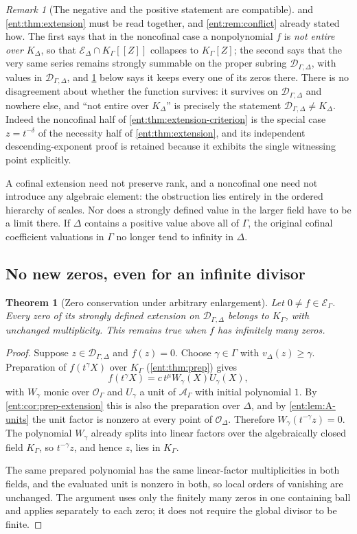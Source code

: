 \documentclass[11pt]{article}
\newtheorem{theorem}{Theorem}[section]
\theoremstyle{plain}
\theoremstyle{plain}
\theoremstyle{plain}
\theoremstyle{definition}
\theoremstyle{definition}
\theoremstyle{definition}
\theoremstyle{definition}
\theoremstyle{remark}
\newtheorem{remark}[remark]{Remark}
\newcommand{\K}{K_\Gamma}\newcommand{\KD}{K_\Delta}
\newcommand{\E}{\mathcal E_\Gamma}
\newcommand{\A}{\mathcal A_\Gamma}\newcommand{\OO}{\mathcal O_\Gamma}
\newcommand{\Dom}{\mathcal D_{\Gamma,\Delta}}
\begin{document}
\begin{remark}[The negative and the positive statement are compatible]
\label{ent:rem:reconcile}
 and \cref{ent:thm:extension} must be read
together, and \cref{ent:rem:conflict} already stated how. The first says that
in the noncofinal case a nonpolynomial $f$ is \emph{not entire over} $\KD$,
so that $\mathcal E_\Delta\cap\K[[Z]]$ collapses to $\K[Z]$; the second says
that the very same series remains strongly summable on the proper subring
$\Dom$, with values in $\Dom$, and \cref{ent:thm:zero-conservation} below
says it keeps every one of its zeros there. There is no disagreement about
whether the function survives: it survives on $\Dom$ and nowhere else, and
``not entire over $\KD$'' is precisely the statement $\Dom\ne\KD$. Indeed the
noncofinal half of \cref{ent:thm:extension-criterion} is the special case
$z=t^{-\delta}$ of the necessity half of \cref{ent:thm:extension}, and its
independent descending-exponent proof is retained because it exhibits the
single witnessing point explicitly.
\end{remark}

A cofinal extension need not preserve rank, and a noncofinal one need not
introduce any algebraic element: the obstruction lies entirely in the ordered
hierarchy of scales. Nor does a strongly defined value in the larger field
have to be a limit there. If $\Delta$ contains a positive value above all of
$\Gamma$, the original cofinal coefficient valuations in $\Gamma$ no longer
tend to infinity in $\Delta$.

\subsection{No new zeros, even for an infinite divisor}
\begin{theorem}[Zero conservation under arbitrary enlargement]
\label{ent:thm:zero-conservation}
Let $0\ne f\in\E$. Every zero of its strongly defined extension on $\Dom$
belongs to $\K$, with unchanged multiplicity. This remains true when $f$ has
infinitely many zeros.
\end{theorem}
\begin{proof}
Suppose $z\in\Dom$ and $f(z)=0$. Choose $\gamma\in\Gamma$ with
$v_\Delta(z)\ge\gamma$. Preparation of $f(t^\gamma X)$ over $\K$
(\cref{ent:thm:prep}) gives
\[
 f(t^\gamma X)=c\,t^{\mu}W_\gamma(X)U_\gamma(X),
\]
with $W_\gamma$ monic over $\OO$ and $U_\gamma$ a unit of $\A$ with initial
polynomial $1$. By \cref{ent:cor:prep-extension} this is also the preparation
over $\Delta$, and by \cref{ent:lem:A-units} the unit factor is nonzero at
every point of $\mathcal O_\Delta$. Therefore $W_\gamma(t^{-\gamma}z)=0$. The
polynomial $W_\gamma$ already splits into linear factors over the
algebraically closed field $\K$, so $t^{-\gamma}z$, and hence $z$, lies in
$\K$.

The same prepared polynomial has the same linear-factor multiplicities in
both fields, and the evaluated unit is nonzero in both, so local orders of
vanishing are unchanged. The argument uses only the finitely many zeros in
one containing ball and applies separately to each zero; it does not require
the global divisor to be finite.
\end{proof}
\end{document}
